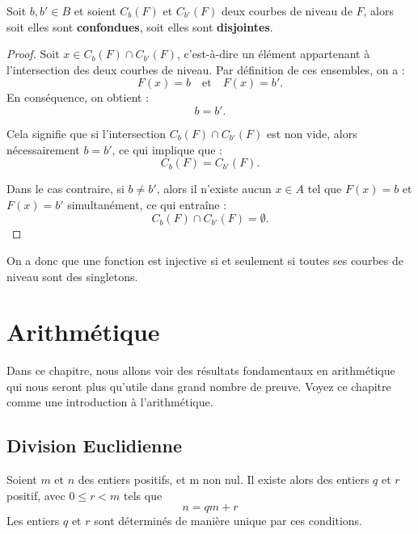 \begin{proposition}
    Soit $b,b'\in B$ et soient \( C_b (F) \) et \( C_{b'} (F) \) deux courbes de niveau de \( F \), alors soit elles sont \textbf{confondues}, soit elles sont \textbf{disjointes}.
\end{proposition} 

\begin{proof}
Soit \( x \in C_b(F) \cap C_{b'}(F) \), c'est-à-dire un élément appartenant à l'intersection des deux courbes de niveau. Par définition de ces ensembles, on a :
\[
F(x) = b \quad \text{et} \quad F(x) = b'.
\]
En conséquence, on obtient :
\[
b = b'.
\]

Cela signifie que si l'intersection \( C_b(F) \cap C_{b'}(F) \) est non vide, alors nécessairement \( b = b' \), ce qui implique que :
\[
C_b(F) = C_{b'}(F).
\]

Dans le cas contraire, si \( b \neq b' \), alors il n'existe aucun \( x \in A \) tel que \( F(x) = b \) et \( F(x) = b' \) simultanément, ce qui entraîne :
\[
C_b(F) \cap C_{b'}(F) = \emptyset.
\]
\end{proof}

\begin{remarque}
    On a donc que une fonction est injective si et seulement si toutes ses courbes de niveau sont des singletons.
\end{remarque}













\section{Arithmétique}
Dans ce chapitre, nous allons voir des résultats fondamentaux en arithmétique qui nous seront plus qu'utile dans grand nombre de preuve. Voyez ce chapitre comme une introduction à l’arithmétique.
\subsection{Division Euclidienne}

\begin{theoreme}
    Soient $m$ et $n$ des entiers positifs, et m non nul. Il existe alors des entiers $q$ et $r$ positif, avec $0\leq r<m$ tels que
    \[
    n=qm +r
    \]
    Les entiers $q$ et $r$ sont déterminés de manière unique par ces conditions.
\end{theoreme}

